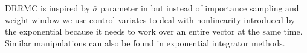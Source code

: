\documentclass[a4paper,12pt]{article}
\begin{document}





\begin{related}[DRRMC]
    DRRMC is inspired by  $\bar{\sigma}$ parameter in \cite{sawhney_grid-free_2022} but
    instead of importance sampling and weight window we use control variates  to deal with
    nonlinearity introduced by the exponential because it needs to work over
    an entire vector at the same time. Similar manipulations can also be found
    in exponential integrator methods.
\end{related}




\end{document}

